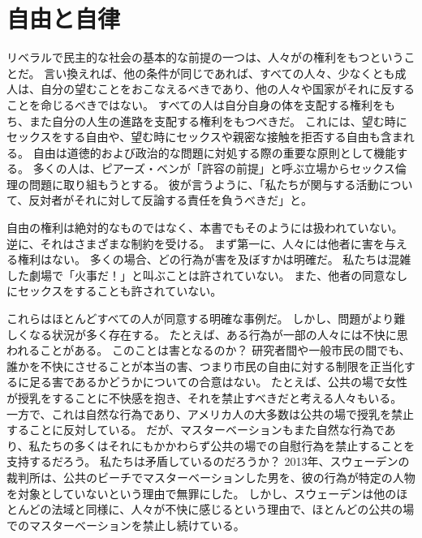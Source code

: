 \documentclass[paper=a4,book,openany]{jlreq}
\begin{document}
\section{自由と自律}

リベラルで民主的な社会の基本的な前提の一つは、人々がの権利をもつということだ。
言い換えれば、他の条件が同じであれば、すべての人々、少なくとも成人は、自分の望むことをおこなえるべきであり、他の人々や国家がそれに反することを命じるべきではない。
すべての人は自分自身の体を支配する権利をもち、また自分の人生の進路を支配する権利をもつべきだ。
これには、望む時にセックスをする自由や、望む時にセックスや親密な接触を拒否する自由も含まれる。
自由は道徳的および政治的な問題に対処する際の重要な原則として機能する。
多くの人は、ピアーズ・ベンが「許容の前提」と呼ぶ立場からセックス倫理の問題に取り組もうとする。
彼が言うように、「私たちが関与する活動について、反対者がそれに対して反論する責任を負うべきだ」と\citep[p.237]{benn99:_is_sex_moral_special}。

自由の権利は絶対的なものではなく、本書でもそのようには扱われていない。
逆に、それはさまざまな制約を受ける。
まず第一に、人々には他者に害を与える権利はない。
多くの場合、どの行為が害を及ぼすかは明確だ。
私たちは混雑した劇場で「火事だ！」と叫ぶことは許されていない。
また、他者の同意なしにセックスをすることも許されていない。

これらはほとんどすべての人が同意する明確な事例だ。
しかし、問題がより難しくなる状況が多く存在する。
たとえば、ある行為が一部の人々には不快に思われることがある。
このことは害となるのか？ 研究者間や一般市民の間でも、誰かを不快にさせることが本当の害、つまり市民の自由に対する制限を正当化するに足る害であるかどうかについての合意はない。
たとえば、公共の場で女性が授乳をすることに不快感を抱き、それを禁止すべきだと考える人々もいる。
一方で、これは自然な行為であり、アメリカ人の大多数は公共の場で授乳を禁止することに反対している\citep{cdc08:_public_opinion_breas}。
だが、マスターベーションもまた自然な行為であり、私たちの多くはそれにもかかわらず公共の場での自慰行為を禁止することを支持するだろう。
私たちは矛盾しているのだろうか？ 2013年、スウェーデンの裁判所は、公共のビーチでマスターベーションした男を、彼の行為が特定の人物を対象としていないという理由で無罪にした\citep{ederyd13:_you_cant_just_walk_aroun}。
しかし、スウェーデンは他のほとんどの法域と同様に、人々が不快に感じるという理由で、ほとんどの公共の場でのマスターベーションを禁止し続けている。
\end{document}
